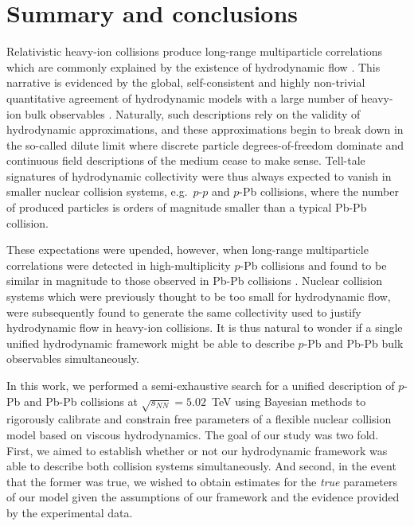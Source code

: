 \documentclass[aps,prc,reprint,amsmath,nofootinbib]{revtex4-1}
\newcommand{\sqrts}{\sqrt{s_{NN}}}
\begin{document}
\section{Summary and conclusions}
\label{sec:summary}

Relativistic heavy-ion collisions produce long-range multiparticle correlations which are commonly explained by the existence of hydrodynamic flow \cite{deSouza:2015ena}.
This narrative is evidenced by the global, self-consistent and highly non-trivial quantitative agreement of hydrodynamic models with a large number of heavy-ion bulk observables \cite{Niemi:2015qia, Bernhard:2016tnd, Gale:2012rq}.
Naturally, such descriptions rely on the validity of hydrodynamic approximations, and these approximations begin to break down in the so-called dilute limit where discrete particle degrees-of-freedom dominate and continuous field descriptions of the medium cease to make sense.
Tell-tale signatures of hydrodynamic collectivity were thus always expected to vanish in smaller nuclear collision systems, e.g.\ $p$-$p$ and $p$-Pb collisions, where the number of produced particles is orders of magnitude smaller than a typical Pb-Pb collision.

These expectations were upended, however, when long-range multiparticle correlations were detected in high-multiplicity $p$-Pb collisions and found to be similar in magnitude to those observed in Pb-Pb collisions \cite{CMS:2012qk, Abelev:2012ola, Aad:2012gla}.
Nuclear collision systems which were previously thought to be too small for hydrodynamic flow, were subsequently found to generate the same collectivity used to justify hydrodynamic flow in heavy-ion collisions.
It is thus natural to wonder if a single unified hydrodynamic framework might be able to describe $p$-Pb and Pb-Pb bulk observables simultaneously.

In this work, we performed a semi-exhaustive search for a unified description of $p$-Pb and Pb-Pb collisions at $\sqrts=5.02$~TeV using Bayesian methods to rigorously calibrate and constrain free parameters of a flexible nuclear collision model based on viscous hydrodynamics.
The goal of our study was two fold.
First, we aimed to establish whether or not our hydrodynamic framework was able to describe both collision systems simultaneously.
And second, in the event that the former was true, we wished to obtain estimates for the \emph{true} parameters of our model given the assumptions of our framework and the evidence provided by the experimental data.
\end{document}
